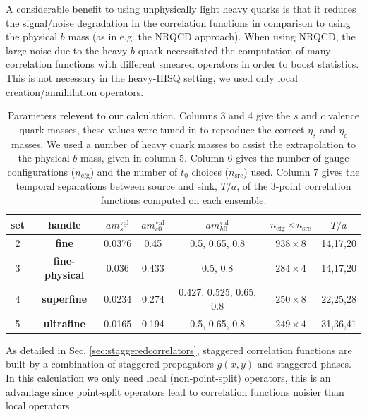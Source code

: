 A considerable benefit to using unphysically light heavy quarks is that it reduces the signal/noise degradation in the correlation functions in comparison to using the physical $b$ mass (as in e.g. the NRQCD approach). When using NRQCD, the large noise due to the heavy $b$-quark necessitated the computation of many correlation functions with different smeared operators in order to boost statistics. This is not necessary in the heavy-HISQ setting, we used only local creation/annihilation operators.

\begin{table}
  \begin{center}
    \begin{tabular}{c c c c c c c}
      \hline
      set & handle & $am_{s0}^{\text{val}}$ & $am_{c0}^{\text{val}}$ & $am^{\text{val}}_{h0}$ & $n_{\text{cfg}}\times n_{\text{src}}$ & $T/a$ \\ [0.5ex]
      \hline
      2 & \bf{fine} & 0.0376 & 0.45 
      & 0.5, 0.65, 0.8 & $938\times 8$ & 14,17,20 \\ [1ex]
      3 & \bf{fine-physical} & 0.036 & 0.433 
      & 0.5, 0.8 & $284\times 4$ & 14,17,20 \\ [1ex]
      4 & \bf{superfine} & 0.0234 & 
      0.274 & 0.427, 0.525, 0.65, 0.8 & $250\times 8$ & 22,25,28  \\ [1ex]
      5 & \bf{ultrafine} & 0.0165 
      & 0.194 & 0.5, 0.65, 0.8 & $249\times 4$ & 31,36,41\\ [1ex]
      \hline
    \end{tabular}
  \end{center}
  \caption{Parameters relevent to our calculation. Columns 3 and 4 give the $s$ and $c$ valence quark masses, these values were tuned in \cite{Chakraborty:2014aca} to reproduce the correct $\eta_s$ and $\eta_c$ masses. We used a number of heavy quark masses to assist the extrapolation to the physical $b$ mass, given in column 5. Column 6 gives the number of gauge configurations ($n_{\text{cfg}}$) and the number of $t_0$ choices ($n_{\text{src}}$) used. Column 7 gives the temporal separations between source and sink, $T/a$, of the 3-point correlation functions computed on each ensemble.}
  \label{tab:BsDsensembles}
\end{table}

As detailed in Sec. \ref{sec:staggeredcorrelators}, staggered correlation functions are built by a combination of staggered propagators $g(x,y)$ and staggered phases. In this calculation we only need local (non-point-split) operators, this is an advantage since point-split operators lead to correlation functions noisier than local operators. 

